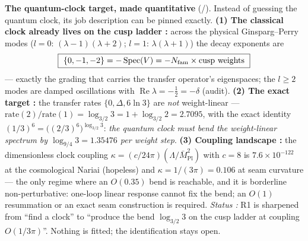 \par\smallskip\noindent\textbf{The quantum-clock target, made quantitative} (\mE/\mC).
Instead of guessing the quantum clock, its job description can be pinned exactly. \textbf{(1) The
classical clock already lives on the cusp ladder \mE:} across the physical Ginsparg--Perry modes
($l=0$: $(\lambda{-}1)(\lambda{+}2)$; $l=1$: $\lambda(\lambda{+}1)$) the decay exponents are
\[
  \boxed{\ \{0,-1,-2\}=-\operatorname{Spec}(V)=-\Nfam\times\text{cusp weights}\ }
\]
--- exactly the grading that carries the transfer operator's eigenspaces; the $l\ge2$ modes
are damped oscillations with $\operatorname{Re}\lambda=-\tfrac12=-\delta$ (audit). \textbf{(2) The exact
target \mE:} the transfer rates $\{0,\Delta,6\ln3\}$ are \emph{not} weight-linear ---
$\mathrm{rate}(2)/\mathrm{rate}(1)=\log_{3/2}3=1+\log_{3/2}2=2.7095$, with the exact identity
$(1/3)^6=\bigl((2/3)^6\bigr)^{\log_{3/2}3}$: \emph{the quantum clock must bend the weight-linear spectrum
by $\log_{9/4}3=1.35476$ per weight step}. \textbf{(3) Coupling landscape \mE:} the dimensionless clock
coupling $\kappa=(c/24\pi)(\Lambda/\bar M_{\mathrm{Pl}}^2)$ with $c=8$ is $7.6\times10^{-122}$ at the
cosmological Nariai (hopeless) and $\kappa=1/(3\pi)=0.106$ at seam curvature --- the only regime where an
$O(0.35)$ bend is reachable, and it is borderline non-perturbative: one-loop linear response cannot fix
the bend; an $O(1)$ resummation or an exact seam construction is required. \emph{Status \mC:} R1 is
sharpened from ``find a clock'' to ``produce the bend $\log_{3/2}3$ on the cusp ladder at coupling
$O(1/3\pi)$''. Nothing is fitted; the identification stays open. 
